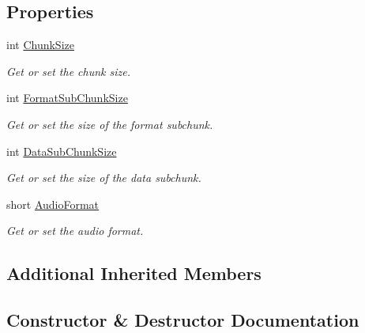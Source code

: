 \subsection*{Properties}
\begin{DoxyCompactItemize}
\item 
int \hyperlink{class_stegosaurus_1_1_carrier_1_1_audio_formats_1_1_wave_file_a65d3fa2945c148a89857b8fdf0612e7d}{Chunk\+Size}
\begin{DoxyCompactList}\small\item\em Get or set the chunk size. \end{DoxyCompactList}\item 
int \hyperlink{class_stegosaurus_1_1_carrier_1_1_audio_formats_1_1_wave_file_a5981b47062913ff15855b36e4c20ff7c}{Format\+Sub\+Chunk\+Size}
\begin{DoxyCompactList}\small\item\em Get or set the size of the format subchunk. \end{DoxyCompactList}\item 
int \hyperlink{class_stegosaurus_1_1_carrier_1_1_audio_formats_1_1_wave_file_a9f9e6f23de0403b656c4cc337def8f49}{Data\+Sub\+Chunk\+Size}
\begin{DoxyCompactList}\small\item\em Get or set the size of the data subchunk. \end{DoxyCompactList}\item 
short \hyperlink{class_stegosaurus_1_1_carrier_1_1_audio_formats_1_1_wave_file_a9e8c8db340f18d23110b9711c9134531}{Audio\+Format}
\begin{DoxyCompactList}\small\item\em Get or set the audio format. \end{DoxyCompactList}\end{DoxyCompactItemize}
\subsection*{Additional Inherited Members}


\subsection{Constructor \& Destructor Documentation}
